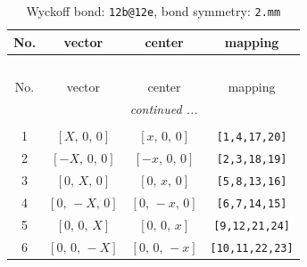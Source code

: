 \documentclass[fleqn,8pt]{jsarticle}
\begin{document}
\renewcommand{\arraystretch}{1.2}
\begin{longtable}{cccc}
\caption{Wyckoff bond: {\tt 12b@12e}, bond symmetry: {\tt 2.mm}}
 \\
 \hline \hline
No. & vector & center & mapping \\ \hline \endfirsthead

\multicolumn{3}{l}{\tablename\ \thetable{}} \\
 \hline \hline
No. & vector & center & mapping \\ \hline \endhead

 \hline \hline
\multicolumn{3}{r}{\footnotesize\it continued ...} \\ \endfoot

 \hline \hline
\multicolumn{3}{r}{} \\ \endlastfoot

1 & $\left[ X,\, 0,\, 0 \right]$ & $\left[ x,\, 0,\, 0 \right]$ & {\tt [1,4,17,20]} \\ \hline
2 & $\left[ - X,\, 0,\, 0 \right]$ & $\left[ - x,\, 0,\, 0 \right]$ & {\tt [2,3,18,19]} \\ \hline
3 & $\left[ 0,\, X,\, 0 \right]$ & $\left[ 0,\, x,\, 0 \right]$ & {\tt [5,8,13,16]} \\ \hline
4 & $\left[ 0,\, - X,\, 0 \right]$ & $\left[ 0,\, - x,\, 0 \right]$ & {\tt [6,7,14,15]} \\ \hline
5 & $\left[ 0,\, 0,\, X \right]$ & $\left[ 0,\, 0,\, x \right]$ & {\tt [9,12,21,24]} \\ \hline
6 & $\left[ 0,\, 0,\, - X \right]$ & $\left[ 0,\, 0,\, - x \right]$ & {\tt [10,11,22,23]} \\
\end{longtable}
\renewcommand{\arraystretch}{1.2}
\end{document}
